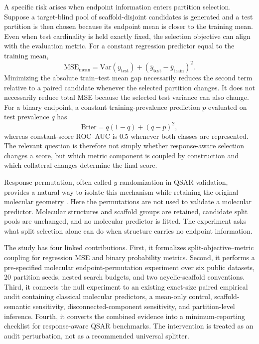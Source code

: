 A specific risk arises when endpoint information enters partition selection. Suppose a target-blind pool of scaffold-disjoint candidates is generated and a test partition is then chosen because its endpoint mean is closer to the training mean. Even when test cardinality is held exactly fixed, the selection objective can align with the evaluation metric. For a constant regression predictor equal to the training mean,
\begin{equation}
\mathrm{MSE}_{\mathrm{mean}}=\mathrm{Var}(y_{\mathrm{test}})+(\bar y_{\mathrm{test}}-\bar y_{\mathrm{train}})^2.
\label{eq:mse-decomposition}
\end{equation}
Minimizing the absolute train--test mean gap necessarily reduces the second term relative to a paired candidate whenever the selected partition changes. It does not necessarily reduce total MSE because the selected test variance can also change. For a binary endpoint, a constant training-prevalence prediction $p$ evaluated on test prevalence $q$ has
\begin{equation}
\mathrm{Brier}=q(1-q)+(q-p)^2,
\label{eq:brier-decomposition}
\end{equation}
whereas constant-score ROC--AUC is 0.5 whenever both classes are represented. The relevant question is therefore not simply whether response-aware selection changes a score, but which metric component is coupled by construction and which collateral changes determine the final score.

Response permutation, often called $y$-randomization in QSAR validation, provides a natural way to isolate this mechanism while retaining the original molecular geometry \citep{rucker2007yrandomization}. Here the permutations are not used to validate a molecular predictor. Molecular structures and scaffold groups are retained, candidate split pools are unchanged, and no molecular predictor is fitted. The experiment asks what split selection alone can do when structure carries no endpoint information.

The study has four linked contributions. First, it formalizes split-objective--metric coupling for regression MSE and binary probability metrics. Second, it performs a pre-specified molecular endpoint-permutation experiment over six public datasets, 20 partition seeds, nested search budgets, and two acyclic-scaffold conventions. Third, it connects the null experiment to an existing exact-size paired empirical audit containing classical molecular predictors, a mean-only control, scaffold-semantic sensitivity, disconnected-component sensitivity, and partition-level inference. Fourth, it converts the combined evidence into a minimum-reporting checklist for response-aware QSAR benchmarks. The intervention is treated as an audit perturbation, not as a recommended universal splitter.
